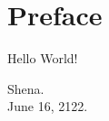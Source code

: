 \documentclass[a4paper,12pt]{article}
\begin{document}
\section*{Preface}
Hello World! \cite{author:book-title}

\begin{flushright}
	Shena.\\
	June 16, 2122.
\end{flushright}
\end{document}
